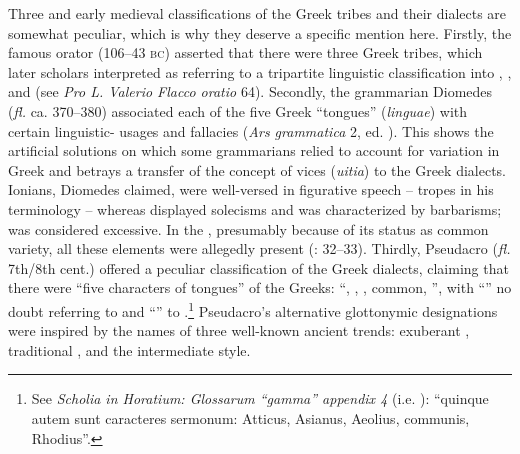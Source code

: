 Three  and early medieval classifications of the Greek tribes and their dialects are somewhat peculiar, which is why they deserve a specific mention here. Firstly, the famous orator  (106–43 \textsc{bc}) asserted that there were three Greek tribes, which later scholars interpreted as referring to a tripartite linguistic classification into , , and  (see \textit{Pro L. Valerio Flacco oratio} 64). Secondly, the grammarian Diomedes (\textit{fl.} ca. 370–380) associated each of the five Greek “tongues” (\textit{linguae}) with certain linguistic- usages and fallacies (\textit{Ars grammatica} 2, ed. \citealt[440]{Keil1857}). This shows the artificial solutions on which some grammarians relied to account for variation in Greek and betrays a transfer of the  concept of vices (\textit{uitia}) to the Greek dialects. Ionians, Diomedes claimed, were well-versed in figurative speech – tropes in his terminology – whereas  displayed solecisms and  was characterized by barbarisms;  was considered excessive. In the , presumably because of its status as common variety, all these elements were allegedly present (\citealt{Consani1991}: 32–33). Thirdly, Pseudacro (\textit{fl.} 7th/8th cent.) offered a peculiar classification of the Greek dialects, claiming that there were “five characters of tongues” of the Greeks: “, , , common, ”, with “” no doubt referring to  and “” to .\footnote{See \textit{Scholia in Horatium: Glossarum “gamma” appendix 4} (i.e. \citealt[385]{Pseudacro1904}): “quinque autem sunt caracteres sermonum: Atticus, Asianus, Aeolius, communis, Rhodius”.} Pseudacro’s alternative glottonymic designations were inspired by the names of three well-known ancient  trends: exuberant , traditional , and the intermediate  style.

